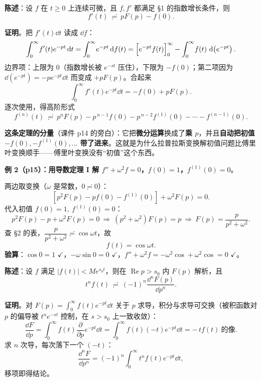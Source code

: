 \documentclass[11pt]{ctexart}
\begin{document}

\textbf{陈述}：设 $f$ 在 $t\ge0$ 上连续可微，且 $f,f'$ 都满足 §1 的指数增长条件，则
\[ f'(t)\ \risingdotseq\ pF(p)-f(0) .\]

\textbf{证明}。把 $f'(t)\dd t$ 读成 $\dd f$：
\[
\int_0^\infty\! f'(t)e^{-pt}\,\mathrm{d} t
=\int_0^\infty\! e^{-pt}\,\mathrm{d} f(t)
=\Bigl[e^{-pt}f(t)\Bigr]_{0}^{\infty}-\int_0^\infty\! f(t)\,\,\mathrm{d}\!\left(e^{-pt}\right) .
\]
边界项：上限为 $0$（指数增长被 $e^{-st}$ 压住），下限为 $-f(0)$；第二项因为 $\dd(e^{-pt})=-pe^{-pt}\dd t$ 而变成 $+pF(p)$。合起来
\[ \int_0^\infty\! f'(t)e^{-pt}\dd t=-f(0)+pF(p) .\]
逐次使用，得高阶形式
\[ f^{(n)}(t)\ \risingdotseq\ p^{n}F(p)-p^{\,n-1}f(0)-p^{\,n-2}f^{(1)}(0)-\cdots-f^{(n-1)}(0) .\]


\textbf{这条定理的分量}（课件 p14 的旁白）：它把\textbf{微分运算}换成了\textbf{乘 $p$}，并且\textbf{自动把初值 $-f(0),-f^{(1)}(0),\dots$ 带了进来}。这就是为什么拉普拉斯变换解初值问题比傅里叶变换顺手——傅里叶变换没有“初值”这个东西。

\textbf{例 2（p15）：用导数定理 I 解 $f''+\omega^{2}f=0$，$f(0)=1$，$f^{(1)}(0)=0$}。

两边取变换（$\omega$ 是常数，$0\risingdotseq0$）：
\[ \left[p^{2}F(p)-pf(0)-f^{(1)}(0)\right]+\omega^{2}F(p)=0 .\]
代入初值 $f(0)=1,\ f^{(1)}(0)=0$：
\[ p^{2}F(p)-p+\omega^{2}F(p)=0\ \Longrightarrow\ (p^{2}+\omega^{2})F(p)=p
\ \Longrightarrow\ F(p)=\frac{p}{p^{2}+\omega^{2}} .\]
查 §2 的表，$\dfrac{p}{p^{2}+\omega^{2}}\risingdotseq\cos\omega t$，故
\[ f(t)=\cos\omega t .\]
\textbf{验算}：$\cos 0=1$ $\checkmark$，$-\omega\sin 0=0$ $\checkmark$，$f''+\omega^{2}f=-\omega^{2}\cos+\omega^{2}\cos=0$ $\checkmark$。



\textbf{陈述}：设 $f$ 满足 $|f(t)|<Me^{s_0t}$，则在 $\operatorname{Re}p>s_0$ 内 $F(p)$ 解析，且
\[ t^{n}f(t)\ \risingdotseq\ (-1)^{n}\frac{\dd^{n}F(p)}{\dd p^{n}} .\]

\textbf{证明}。对 $F(p)=\int_0^\infty f(t)e^{-pt}\dd t$ 关于 $p$ 求导，积分与求导可交换（被积函数对 $p$ 的偏导被 $t^{n}e^{-st}$ 控制，在 $s>s_0$ 上一致收敛）：
\[
\frac{\dd F}{\dd p}=\int_0^\infty f(t)\frac{\partial}{\partial p}e^{-pt}\dd t
=\int_0^\infty f(t)(-t)e^{-pt}\dd t=-\,t f(t)\ \text{的像} .
\]
求 $n$ 次导，每次落下一个 $(-t)$：
\[ \frac{\dd^{n}F}{\dd p^{n}}=(-1)^{n}\int_0^\infty t^{n}f(t)e^{-pt}\dd t ,\]
移项即得结论。
\end{document}
